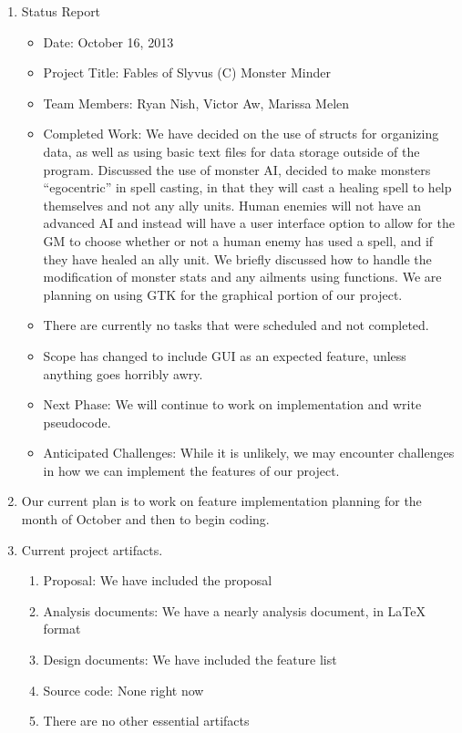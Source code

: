 \documentclass[letterpaper,12pt]{letter}
\begin{document}
\begin{enumerate}
\item Status Report
\begin{itemize}
\item Date: October 16, 2013
\item Project Title: Fables of Slyvus (C) Monster Minder
\item Team Members: Ryan Nish, Victor Aw, Marissa Melen
\item Completed Work: We have decided on the use of structs for organizing data, as well as using basic text files for data storage outside of the program.  Discussed the use of monster AI, decided to make monsters “egocentric” in spell casting, in that they will cast a healing spell to help themselves and not any ally units.  Human enemies will not have an advanced AI and instead will have a user interface option to allow for the GM to choose whether or not a human enemy has used a spell, and if they have healed an ally unit.  We briefly discussed how to handle the modification of monster stats and any ailments using functions. We are planning on using GTK for the graphical portion of our project.
\item There are currently no tasks that were scheduled and not completed.
\item Scope has changed to include GUI as an expected feature, unless anything goes horribly awry.
\item Next Phase: We will continue to work on implementation and write pseudocode.
\item Anticipated Challenges: While it is unlikely, we may encounter
  challenges in how we can implement the features of our project.
\end{itemize}
\item Our current plan is to work on feature implementation planning for the month of October and then to begin coding.
\item Current project artifacts.
\begin{enumerate}
\item Proposal: We have included the proposal 
\item Analysis documents: We have a nearly analysis document, in LaTeX format
\item Design documents: We have included the feature list 
\item Source code: None right now
\item There are no other essential artifacts
\end{enumerate}
\end{enumerate}
\end{document}
